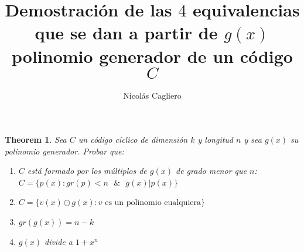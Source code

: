\documentclass[11pt]{article}
\title{Demostración de las $4$ equivalencias que se dan a partir de $g(x)$ polinomio generador de un código $C$ }
\author{Nicolás Cagliero}
\newtheorem{theorem}{Theorem}
\begin{document}
\maketitle
\begin{theorem} Sea $C$ un código cíclico de dimensión $k$ y longitud $n$ y sea $g(x)$ su polinomio generador. Probar que: 
\begin{enumerate}
\item $C$ está formado por los múltiplos de $g(x)$ de grado menor que $n$:  $C = \{p(x): gr(p) < n \text{ } \& \text{ }  g(x)|p(x)\} $
\

\item  $C = \{v(x) \odot g(x):  \text{$v$ es un polinomio cualquiera} \}$ 
\

\item $gr(g(x)) = n - k$
\

\item $g(x)$ divide a $1 + x^{n}$
\end{enumerate}
\end{theorem}
\end{document}

